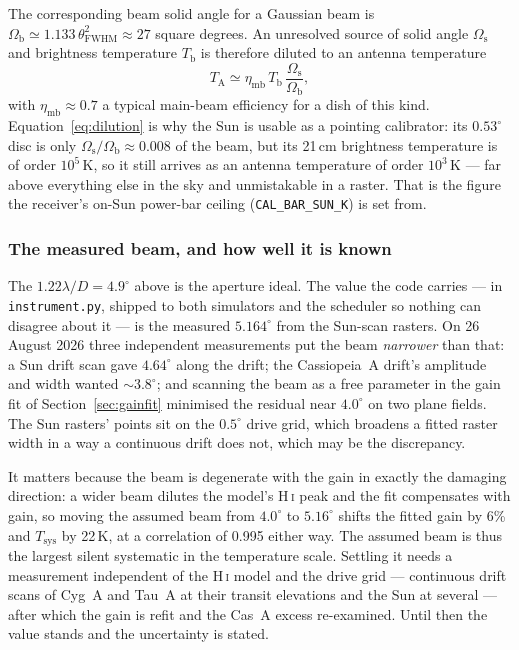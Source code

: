 \documentclass[11pt,a4paper]{article}
\begin{document}
The corresponding beam solid angle for a Gaussian beam is $\Omega_\text{b} \simeq 1.133\,\theta_\text{FWHM}^2 \approx 27$ square degrees. An unresolved source of solid angle $\Omega_\text{s}$ and brightness temperature $T_\text{b}$ is therefore diluted to an antenna temperature
\begin{equation}
T_\text{A} \simeq \eta_\text{mb}\,T_\text{b}\,\frac{\Omega_\text{s}}{\Omega_\text{b}},
\label{eq:dilution}
\end{equation}
with $\eta_\text{mb} \approx 0.7$ a typical main-beam efficiency for a dish of this kind. Equation~\eqref{eq:dilution} is why the Sun is usable as a pointing calibrator: its $0.53^\circ$ disc is only $\Omega_\text{s}/\Omega_\text{b} \approx 0.008$ of the beam, but its 21\,cm brightness temperature is of order $10^5$\,K, so it still arrives as an antenna temperature of order $10^3$\,K --- far above everything else in the sky and unmistakable in a raster. That is the figure the receiver's on-Sun power-bar ceiling (\texttt{CAL\_BAR\_SUN\_K}) is set from.

\subsubsection{The measured beam, and how well it is known}
\label{sec:beamwidth}

The $1.22\lambda/D = 4.9^\circ$ above is the aperture ideal. The value the code carries --- in \texttt{instrument.py}, shipped to both simulators and the scheduler so nothing can disagree about it --- is the measured $5.164^\circ$ from the Sun-scan rasters. On 26 August 2026 three independent measurements put the beam \emph{narrower} than that: a Sun drift scan gave $4.64^\circ$ along the drift; the Cassiopeia~A drift's amplitude and width wanted $\sim 3.8^\circ$; and scanning the beam as a free parameter in the gain fit of Section~\ref{sec:gainfit} minimised the residual near $4.0^\circ$ on two plane fields. The Sun rasters' points sit on the $0.5^\circ$ drive grid, which broadens a fitted raster width in a way a continuous drift does not, which may be the discrepancy.

It matters because the beam is degenerate with the gain in exactly the damaging direction: a wider beam dilutes the model's H\,\textsc{i} peak and the fit compensates with gain, so moving the assumed beam from $4.0^\circ$ to $5.16^\circ$ shifts the fitted gain by 6\% and $T_\text{sys}$ by 22\,K, at a correlation of 0.995 either way. The assumed beam is thus the largest silent systematic in the temperature scale. Settling it needs a measurement independent of the H\,\textsc{i} model and the drive grid --- continuous drift scans of Cyg~A and Tau~A at their transit elevations and the Sun at several --- after which the gain is refit and the Cas~A excess re-examined. Until then the value stands and the uncertainty is stated.
\end{document}
